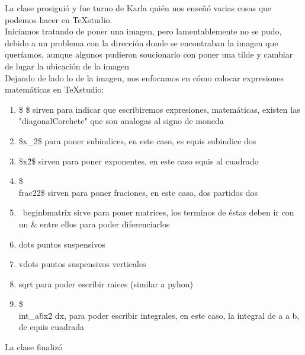 \documentclass[letterpaper, 12pt, oneside]{article}%
\begin{document}
La clase prosiguió y fue turno de Karla quién nos enseñó varias cosas que podemos hacer en TeXstudio. \\
Iniciamos tratando de poner una imagen, pero lamentablemente no se pudo, debido a un problema con la dirección donde se encontraban la imagen que queríamos, aunque algunos pudieron soucionarlo con poner una tilde y cambiar de lugar la ubicación de la imagen\\
Dejando de lado lo de la imagen, nos enfocamos en cómo colocar expresiones matemáticas en TeXstudio:
\begin{enumerate}
\item \$ \$ sirven para indicar que escribiremos expresiones, matemáticas, existen las "diagonalCorchete" que son analogas al signo de moneda
\item \$x\_{2}\$ para poner subindices, en este caso, es equis subindice dos
\item \$x\^{2}\$ sirven para poner exponentes, en este caso equis al cuadrado
\item \$\\frac{2}{2}\$ sirven para poner fraciones, en este caso, dos partidos dos
\item \ begin{bmatrix} sirve para poner matrices, los terminos de éstas deben ir con un \& entre ellos para poder diferenciarlos
\item dots puntos suspensivos
\item vdots puntos suspensivos  verticales
\item sqrt para poder escribir raices (similar a pyhon)
\item \$\\int\_{a}\^{b}x\^2 dx, para poder escribir integrales, en este caso, la integral de a a b, de equis cuadrada


\end{enumerate}
La clase finalizó
\end{document}
